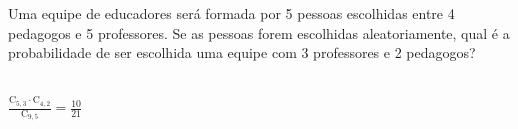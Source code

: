 \begin{ex}
Uma equipe de educadores será formada por 5 pessoas escolhidas entre 4 pedagogos e 5 professores. Se as pessoas forem escolhidas aleatoriamente, qual é a probabilidade de ser escolhida uma equipe com 3 professores e 2 pedagogos?

 \begin{sol}
  \phantom{A}\\
  $\frac{\mathrm{C}_{5,3}\cdot\mathrm{C}_{4,2}}{\mathrm{C}_{9,5}}=\frac{10}{21}$
 \end{sol}
\end{ex}